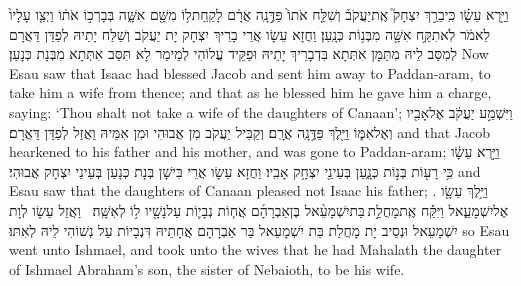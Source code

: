 {וַיַּ֣רְא עֵשָׂ֗ו כִּֽי\maqqaf בֵרַ֣ךְ יִצְחָק֮ אֶֽת\maqqaf יַעֲקֹב֒ וְשִׁלַּ֤ח אֹתוֹ֙ פַּדֶּ֣נָֽה אֲרָ֔ם לָקַֽחַת\maqqaf ל֥וֹ מִשָּׁ֖ם אִשָּׁ֑ה בְּבָרְכ֣וֹ אֹת֔וֹ וַיְצַ֤ו עָלָיו֙ לֵאמֹ֔ר לֹֽא\maqqaf תִקַּ֥ח אִשָּׁ֖ה מִבְּנ֥וֹת כְּנָֽעַן׃}
{וַחֲזָא עֵשָׂו אֲרֵי בָרֵיךְ יִצְחָק יָת יַעֲקֹב וְשַׁלַּח יָתֵיהּ לְפַדַּן דַּאֲרָם לְמִסַּב לֵיהּ מִתַּמָּן אִתְּתָא בִּדְבָרֵיךְ יָתֵיהּ וּפַקֵּיד עֲלוֹהִי לְמֵימַר לָא תִּסַּב אִתְּתָא מִבְּנָת כְּנָעַן׃}
{Now Esau saw that Isaac had blessed Jacob and sent him away to Paddan-aram, to take him a wife from thence; and that as he blessed him he gave him a charge, saying: ‘Thou shalt not take a wife of the daughters of Canaan’;}{}
{וַיִּשְׁמַ֣ע יַעֲקֹ֔ב אֶל\maqqaf אָבִ֖יו וְאֶל\maqqaf אִמּ֑וֹ וַיֵּ֖לֶךְ פַּדֶּ֥נָֽה אֲרָֽם׃}
{וְקַבֵּיל יַעֲקֹב מִן אֲבוּהִי וּמִן אִמֵּיהּ וַאֲזַל לְפַדַּן דַּאֲרָם׃}
{and that Jacob hearkened to his father and his mother, and was gone to Paddan-aram;}{}
{וַיַּ֣רְא עֵשָׂ֔ו כִּ֥י רָע֖וֹת בְּנ֣וֹת כְּנָ֑עַן בְּעֵינֵ֖י יִצְחָ֥ק אָבִֽיו׃}
{וַחֲזָא עֵשָׂו אֲרֵי בִּישָׁן בְּנָת כְּנָעַן בְּעֵינֵי יִצְחָק אֲבוּהִי׃}
{and Esau saw that the daughters of Canaan pleased not Isaac his father; .}{}
{וַיֵּ֥לֶךְ עֵשָׂ֖ו אֶל\maqqaf יִשְׁמָעֵ֑אל וַיִּקַּ֡ח אֶֽת\maqqaf מָחֲלַ֣ת \legarmeh  בַּת\maqqaf יִשְׁמָעֵ֨אל בֶּן\maqqaf אַבְרָהָ֜ם אֲח֧וֹת נְבָי֛וֹת עַל\maqqaf נָשָׁ֖יו ל֥וֹ לְאִשָּֽׁה׃ \setuma }
{וַאֲזַל עֵשָׂו לְוָת יִשְׁמָעֵאל וּנְסֵיב יָת מָחֲלַת בַּת יִשְׁמָעֵאל בַּר אַבְרָהָם אֲחָתֵיהּ דִּנְבָיוֹת עַל נְשׁוֹהִי לֵיהּ לְאִתּוּ׃}
{so Esau went unto Ishmael, and took unto the wives that he had Mahalath the daughter of Ishmael Abraham’s son, the sister of Nebaioth, to be his wife.}{}
